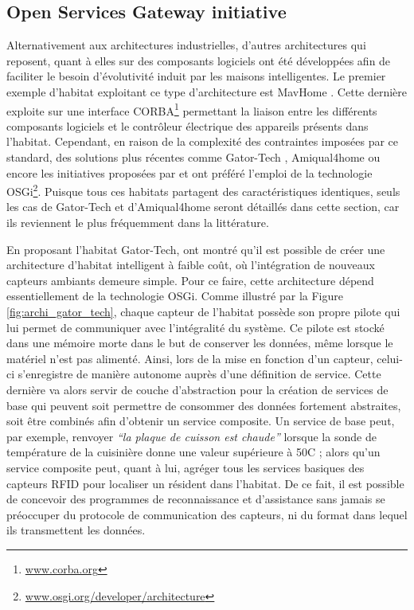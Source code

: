 \subsection{Open Services Gateway initiative}

Alternativement aux architectures industrielles, d'autres architectures qui reposent, quant à elles sur des composants logiciels ont été développées afin de faciliter le besoin d'évolutivité induit par les maisons intelligentes. Le premier exemple d'habitat exploitant ce type d'architecture est MavHome \citep{DJCook2003}. Cette dernière exploite sur une interface \ac{CORBA}\footnote{\url{www.corba.org}} permettant la liaison entre les différents composants logiciels et le contrôleur électrique des appareils présents dans l'habitat. Cependant, en raison de la complexité des contraintes imposées par ce standard, des solutions plus récentes comme Gator-Tech \citep{Helal2005}, Amiqual4home \citep{Lago2017} ou encore les initiatives proposées par \cite{Novak2011} et \cite{Cheng2012} ont préféré l'emploi de la technologie \ac{OSGi}\footnote{\url{www.osgi.org/developer/architecture}}. Puisque tous ces habitats partagent des caractéristiques identiques, seuls les cas de Gator-Tech et d'Amiqual4home seront détaillés dans cette section, car ils reviennent le plus fréquemment dans la littérature.

En proposant l'habitat Gator-Tech, \cite{Helal2005} ont montré qu'il est possible de créer une architecture d'habitat intelligent à faible coût, où l'intégration de nouveaux capteurs ambiants demeure simple. Pour ce faire, cette architecture dépend essentiellement de la technologie \acs{OSGi}. Comme illustré par la Figure \ref{fig:archi_gator_tech}, chaque capteur de l'habitat possède son propre pilote qui lui permet de communiquer avec l'intégralité du système. Ce pilote est stocké dans une mémoire morte dans le but de conserver les données, même lorsque le matériel n'est pas alimenté. Ainsi, lors de la mise en fonction d'un capteur, celui-ci s'enregistre de manière autonome auprès d'une définition de service. Cette dernière va alors servir de couche d'abstraction pour la création de services de base qui peuvent soit permettre de consommer des données fortement abstraites, soit être combinés afin d'obtenir un service composite. Un service de base peut, par exemple, renvoyer \textit{``la plaque de cuisson est chaude''} lorsque la sonde de température de la cuisinière donne une valeur supérieure à 50\textdegree{}C ; alors qu'un service composite peut, quant à lui, agréger tous les services basiques des capteurs \ac{RFID} pour localiser un résident dans l'habitat. De ce fait, il est possible de concevoir des programmes de reconnaissance et d'assistance sans jamais se préoccuper du protocole de communication des capteurs, ni du format dans lequel ils transmettent les données.

